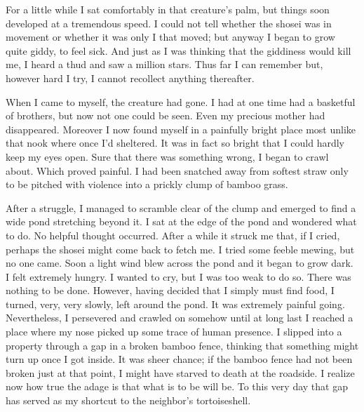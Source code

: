 \documentclass[12pt, openright]{book}
\begin{document}
For a little while I sat comfortably in that creature's palm, but things
soon developed at a tremendous speed. I could not tell whether the
shosei was in movement or whether it was only I that moved; but anyway I
began to grow quite giddy, to feel sick. And just as I was thinking that
the giddiness would kill me, I heard a thud and saw a million stars.
Thus far I can remember but, however hard I try, I cannot recollect
anything thereafter.

When I came to myself, the creature had gone. I had at one time had a
basketful of brothers, but now not one could be seen. Even my precious
mother had disappeared. Moreover I now found myself in a painfully
bright place most unlike that nook where once I'd sheltered. It was in
fact so bright that I could hardly keep my eyes open. Sure that there
was something wrong, I began to crawl about. Which proved painful. I had
been snatched away from softest straw only to be pitched with violence
into a prickly clump of bamboo grass.

After a struggle, I managed to scramble clear of the clump and emerged
to find a wide pond stretching beyond it. I sat at the edge of the pond
and wondered what to do. No helpful thought occurred. After a while it
struck me that, if I cried, perhaps the shosei might come back to fetch
me. I tried some feeble mewing, but no one came. Soon a light wind blew
across the pond and it began to grow dark. I felt extremely hungry. I
wanted to cry, but I was too weak to do so. There was nothing to be
done. However, having decided that I simply must find food, I turned,
very, very slowly, left around the pond. It was extremely painful going.
Nevertheless, I persevered and crawled on somehow until at long last I
reached a place where my nose picked up some trace of human presence. I
slipped into a property through a gap in a broken bamboo fence, thinking
that something might turn up once I got inside. It was sheer chance; if
the bamboo fence had not been broken just at that point, I might have
starved to death at the roadside. I realize now how true the adage is
that what is to be will be. To this very day that gap has served as my
shortcut to the neighbor's tortoiseshell.
\end{document}
